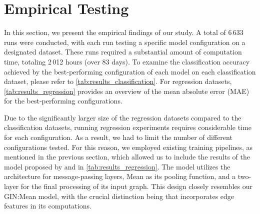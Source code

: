 \section{Empirical Testing}\label{sec:emprical_results}
In this section, we present the empirical findings of our study. A total of 6\,633 runs were conducted, with each run testing a specific model configuration on a designated dataset. These runs required a substantial amount of computation time, totaling 2\,012 hours (over 83 days). To examine the classification accuracy achieved by the best-performing configuration of each model on each classification dataset, please refer to \cref{tab:results_classification}. For regression datasets, \cref{tab:results_regression} provides an overview of the mean absolute error (MAE) for the best-performing configurations.

Due to the significantly larger size of the regression datasets compared to the classification datasets, running regression experiments requires considerable time for each configuration. As a result, we had to limit the number of different configurations tested. For this reason, we employed existing training pipelines, as mentioned in the previous section, which allowed us to include the results of the \gineeps model proposed by \cite{Mor+2020} and \cite{Morris2022} in \cref{tab:results_regression}.
The \gineeps model utilizes the \gin architecture for message-passing layers, \textsf{Mean} as its pooling function, and a two-layer \mlp for the final processing of its input graph. This design closely resembles our \textsf{GIN:Mean} model, with the crucial distinction being that \gineeps incorporates edge features in its computations.

